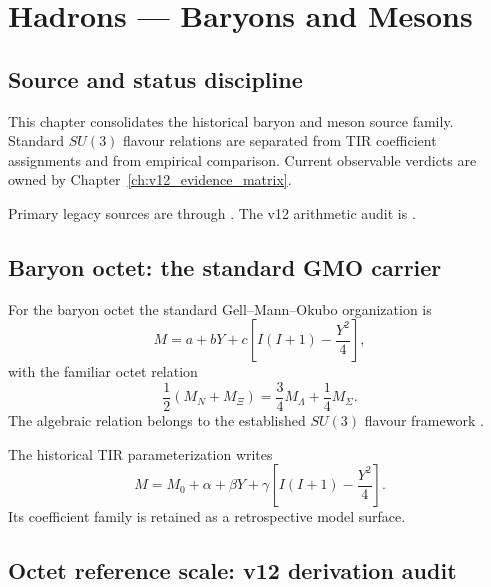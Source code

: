 \chapter{Hadrons — Baryons and Mesons}
\label{ch:v12_hadrons}

\section{Source and status discipline}

This chapter consolidates the historical baryon and meson source family. Standard $SU(3)$ flavour relations are separated from TIR coefficient assignments and from empirical comparison. Current observable verdicts are owned by Chapter~\ref{ch:v12_evidence_matrix}.

Primary legacy sources are
 through . The v12 arithmetic audit is
.

\section{Baryon octet: the standard GMO carrier}

For the baryon octet the standard Gell--Mann--Okubo organization is
\begin{equation}
M = a+bY+c\left[I(I+1)-\frac{Y^2}{4}\right],
\label{eq:v12_gmo_standard}
\end{equation}
with the familiar octet relation
\begin{equation}
\boxed{
\frac12(M_N+M_\Xi)=\frac34M_\Lambda+\frac14M_\Sigma.
}
\label{eq:v12_gmo_relation}
\end{equation}
The algebraic relation belongs to the established $SU(3)$ flavour framework \cite{GellMann1962,okubo1962}.

The historical TIR parameterization writes
\begin{equation}
M=M_0+\alpha+\beta Y+\gamma\left[I(I+1)-\frac{Y^2}{4}\right].
\label{eq:v12_tir_gmo}
\end{equation}
Its coefficient family is retained as a retrospective model surface.

\section{Octet reference scale: v12 derivation audit}

